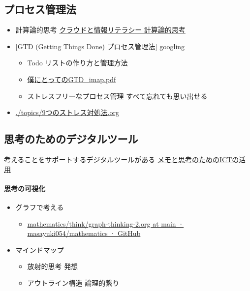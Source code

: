 \documentclass[dvipdfmx,11pat]{jarticle}
\begin{document}
\subsection{プロセス管理法}
\label{sec:org6df0dbf}
\begin{itemize}
\item 計算論的思考 \href{https://masayuki054.github.io/cloud\_and\_information\_literacy/docs/computational\_thinking.html}{クラウドと情報リテラシー 計算論的思考}
\item {[}GTD (Getting Things Done) プロセス管理法] googling 
\begin{itemize}
\item Todo リストの作り方と管理方法
\item \href{https://masayuki054.github.io/cloud\_and\_information\_literacy/i\_maps/\%E5\%83\%95\%E3\%81\%AB\%E3\%81\%A8\%E3\%81\%A3\%E3\%81\%A6\%E3\%81\%AEGTD\_imap.pdf}{僕にとってのGTD\_imap.pdf}
\item ストレスフリーなプロセス管理 すべて忘れても思い出せる
\end{itemize}
\item \url{./topics/9つのストレス対処法.org}
\end{itemize}
\subsection{思考のためのデジタルツール}
\label{sec:org4fc3a23}
考えることをサポートするデジタルツールがある \href{https://masayuki054.github.io/ict\_literacy\_for\_thinking\_and\_memo/}{メモと思考のためのICTの活用}
\paragraph{思考の可視化}
\label{sec:orgf02ff58}
\begin{itemize}
\item グラフで考える
\begin{itemize}
\item \href{https://github.com/masayuki054/mathematics/blob/main/think/graph-thinking-2.org}{mathematics/think/graph-thinking-2.org at main · masayuki054/mathematics · GitHub}
\end{itemize}
\item マインドマップ
\begin{itemize}
\item 放射的思考 発想
\item アウトライン構造 論理的繋り
\end{itemize}
\end{itemize}
\end{document}
